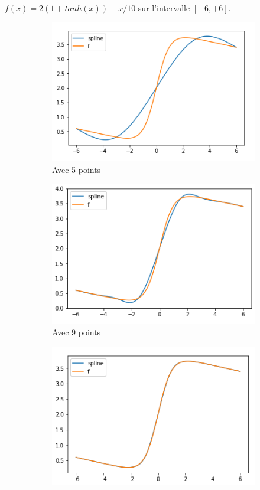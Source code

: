 $f(x) = 2(1 + tanh(x)) - x/10$ sur l'intervalle $[-6,+6]$.
\begin{figure}[h]
  \centering
  \begin{subfigure}[b]{0.4\linewidth}
    \includegraphics[width=\linewidth]{fig5}
    \caption{Avec 5 points}
  \end{subfigure}
  \begin{subfigure}[b]{0.4\linewidth}
    \includegraphics[width=\linewidth]{fig6}
    \caption{Avec 9 points}
  \end{subfigure}
  \begin{subfigure}[b]{0.4\linewidth}
    \includegraphics[width=\linewidth]{fig7}

\end{subfigure}
\end{figure}
